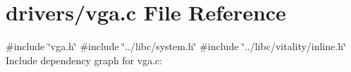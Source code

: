\hypertarget{a00002}{}\section{drivers/vga.c File Reference}
\label{a00002}
{\ttfamily \#include \char`\"{}vga.\+h\char`\"{}}\newline
{\ttfamily \#include \char`\"{}../libc/system.\+h\char`\"{}}\newline
{\ttfamily \#include \char`\"{}../libc/vitality/inline.\+h\char`\"{}}\newline
Include dependency graph for vga.\+c\+:

